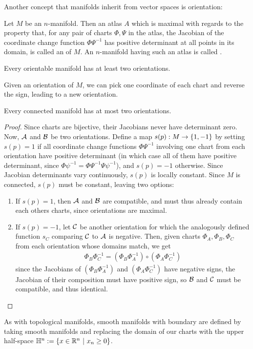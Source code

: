Another concept that manifolds inherit from vector spaces is orientation:
\begin{importantdefinition}{}{}
	Let $M$ be an $n$-manifold. Then an atlas $A$ which is maximal with regards to the property that, for any pair of charts $\Phi, \Psi$ in the atlas, the Jacobian of the coordinate change function $\Phi\Psi^{-1}$ has positive determinant at all points in its domain, is called an  of $M$. An $n$-manifold having such an atlas is called .
\end{importantdefinition}
\begin{theorem}
	Every orientable manifold has at least two orientations.
\end{theorem}
\begin{proofsketch}
	Given an orientation of $M$, we can pick one coordinate of each chart and reverse the sign, leading to a new orientation.
\end{proofsketch}
\begin{theorem}
	Every connected manifold has at most two orientations.
\end{theorem}
\begin{proof}
	Since charts are bijective, their Jacobians never have determinant zero.
	\newpar
	Now, $\mathcal{A}$ and $\mathcal{B}$ be two orientations. Define a map
	$s(p) : M \to \qty{1,-1}$ by setting $s(p) = 1$ if all coordinate change functions $\Phi\Psi^{-1}$ involving one chart from each orientation have positive determinant (in which case all of them have positive determinant, since $\Phi\psi^{-1} = \Phi\Psi^{-1}\Psi\psi^{-1}$), and $s(p) = -1$ otherwise. Since Jacobian determinants vary continuously, $s(p)$ is locally constant. Since $M$ is connected, $s(p)$ must be constant, leaving two options:
	\begin{enumerate}
		\item If $s(p) = 1$, then $\mathcal{A}$ and $\mathcal{B}$ are compatible, and must thus already contain each others charts, since orientations are maximal.
		\item If $s(p) = -1$, let $\mathcal{C}$ be another orientation for which the analogously defined function $s_C$ comparing $\mathcal{C}$ to $\mathcal{A}$ is negative. Then, given charts $\Phi_A, \Phi_B, \Phi_C$ from each orientation whose domains match, we get
		\begin{align*}
			\Phi_B \Phi_C^{-1} = (\Phi_B \Phi_A^{-1}) \circ (\Phi_A \Phi_C^{-1})
		\end{align*}
		since the Jacobians of $(\Phi_B \Phi_A^{-1})$ and $(\Phi_A \Phi_C^{-1})$ have negative signs, the Jacobian of their composition must have positive sign, so $\mathcal{B}$ and $\mathcal{C}$ must be compatible, and thus identical.
	\end{enumerate}
\end{proof}
\begin{definition}
	As with topological manifolds, smooth manifolds with boundary are defined by taking smooth manifolds and replacing the domain of our charts with the upper half-space $\mathbb{H}^n := \qty{x \in \mathbb{R}^n ~\middle|~x_n \geq 0}$.
\end{definition}
